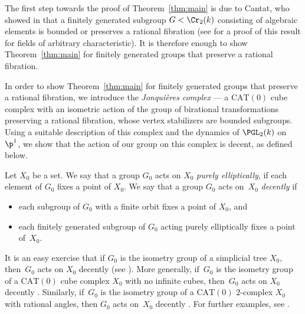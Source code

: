 \begin{remark}\label{rmk_redu_Cantat}
The first step towards the proof of Theorem~\ref{thm:main} is due to Cantat, who showed in \cite{Cantat_groupes_birat} that a finitely generated subgroup $G<\Cr_2(k)$ consisting of algebraic elements is bounded or preserves a rational fibration (see \cite{Lamy_Cremona} for a proof of this result for fields of arbitrary characteristic). It is therefore enough to show Theorem~\ref{thm:main} for finitely generated groups that preserve a rational fibration.
\end{remark}

{In order to show Theorem~\ref{thm:main} for finitely generated groups that preserve a rational fibration}, we introduce the \emph{Jonquières complex} --- a $\mathrm{CAT}(0)$ cube complex with an isometric action of the group of birational transformations preserving a rational fibra\-tion, whose vertex stabilizers are bounded subgroups. Using a suitable description of this complex and the dynamics of $\PGL_2(k)$ on $\p^1$, we show that the action of our group on this complex is decent, as defined below.

\begin{definition}
\label{def:decent}
Let $X_0$ be a set. We say that a group $G_0$ acts on $X_0$ \emph{purely elliptically}, if each element of $G_0$ fixes a point of $X_0$. We say that a group $G_0$ acts on~$X_0$ \emph{decently} if
\begin{itemize}
\item
each subgroup of $G_0$ with a finite orbit fixes a point of $X_0$, and
\item
each finitely generated subgroup of $G_0$ acting purely elliptically fixes a point of~$X_0$.
\end{itemize}
\end{definition}

It is an easy exercise
that if $G_0$ is the isometry group of a simplicial tree $X_0$, then~$G_0$ acts on $X_0$ decently {(see \cite[Cor.\,3 in \S6.5 \& Ex.\,6.3.4]{Serre})}. More generally, if~$G_0$ is the isometry group of a $\mathrm{CAT}(0)$ cube complex $X_0$ with no infinite cubes, then~$G_0$ acts on $X_0$ decently \cite{GLU_Neretin}. Similarly, if~$G_0$ is the isometry group of a $\mathrm{CAT}(0)$ $2$-complex $X_0$ with rational angles, then $G_0$ acts on~$X_0$ decently \cite{NOP}. For further examples, see \cite{HO}.

